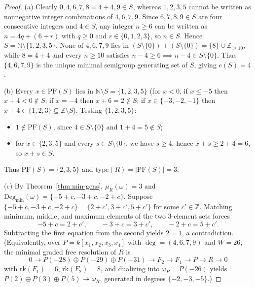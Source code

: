 \documentclass[11pt]{article}
\theoremstyle{definition}
\theoremstyle{remark}
\begin{document}
\begin{proof}
(a) Clearly $0, 4, 6, 7, 8 = 4 + 4, 9 \in S$, whereas $1, 2, 3, 5$ cannot be written as nonnegative integer combinations of $4, 6, 7, 9$. Since $6, 7, 8, 9 \in S$ are four consecutive integers and $4 \in S$, any integer $n \ge 6$ can be written as $n = 4q + (6 + r)$ with $q \ge 0$ and $r \in \{0, 1, 2, 3\}$, so $n \in S$. Hence $S = \mathbb{N} \setminus \{1, 2, 3, 5\}$. None of $4, 6, 7, 9$ lies in $(S \setminus \{0\}) + (S \setminus \{0\}) = \{8\} \cup \mathbb{Z}_{\ge 10}$, while $8 = 4 + 4$ and every $n \ge 10$ satisfies $n - 4 \ge 6 \implies n - 4 \in S \setminus \{0\}$. Thus $\{4, 6, 7, 9\}$ is the unique minimal semigroup generating set of $S$, giving $e(S) = 4$.

(b) Every $x \in \mathrm{PF}(S)$ lies in $\mathbb{N} \setminus S = \{1, 2, 3, 5\}$ (for $x < 0$, if $x \le -5$ then $x + 4 < 0 \notin S$; if $x = -4$ then $x + 6 = 2 \notin S$; if $x \in \{-3, -2, -1\}$ then $x + 4 \in \{1, 2, 3\} \subseteq \mathbb{Z} \setminus S$). Testing $\{1, 2, 3, 5\}$:
\begin{itemize}
  \item $1 \notin \mathrm{PF}(S)$, since $4 \in S \setminus \{0\}$ and $1 + 4 = 5 \notin S$;
  \item for $x \in \{2, 3, 5\}$ and every $s \in S \setminus \{0\}$, we have $s \ge 4$, hence $x + s \ge 2 + 4 = 6$, so $x + s \in S$.
\end{itemize}
Thus $\mathrm{PF}(S) = \{2, 3, 5\}$ and $\mathrm{type}(R) = |\mathrm{PF}(S)| = 3$.

(c) By Theorem~\ref{thm:min-gens}, $\mu_R(\omega) = 3$ and $\mathrm{Deg}_{\min}(\omega) = \{-5 + c, -3 + c, -2 + c\}$. Suppose $\{-5 + c, -3 + c, -2 + c\} = \{2 + c', 3 + c', 5 + c'\}$ for some $c' \in \mathbb{Z}$. Matching minimum, middle, and maximum elements of the two $3$-element sets forces
\[
  -5 + c = 2 + c', \qquad -3 + c = 3 + c', \qquad -2 + c = 5 + c'.
\]
Subtracting the first equation from the second yields $2 = 1$, a contradiction. (Equivalently, over $P = k[x_1, x_2, x_3, x_4]$ with $\deg = (4, 6, 7, 9)$ and $W = 26$, the minimal graded free resolution of $R$ is
\[
  0 \longrightarrow P(-28) \oplus P(-29) \oplus P(-31) \longrightarrow F_2 \longrightarrow F_1 \longrightarrow P \longrightarrow R \longrightarrow 0
\]
with $\mathrm{rk}(F_1) = 6$, $\mathrm{rk}(F_2) = 8$, and dualizing into $\omega_P = P(-26)$ yields $P(2) \oplus P(3) \oplus P(5) \twoheadrightarrow \omega_R$, generated in degrees $\{-2, -3, -5\}$.)
\end{proof}
\end{document}
